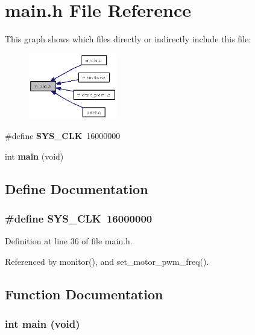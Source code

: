 \section{main.h File Reference}
\label{main_8h}


This graph shows which files directly or indirectly include this file:\begin{figure}[H]
\begin{center}
\leavevmode
\includegraphics[width=109pt]{main_8h__dep__incl}
\end{center}
\end{figure}
\begin{CompactItemize}
\item 
\#define {\bf SYS\_\-CLK}~16000000
\item 
int {\bf main} (void)
\end{CompactItemize}


\subsection{Define Documentation}
\subsubsection{\setlength{\rightskip}{0pt plus 5cm}\#define SYS\_\-CLK~16000000}\label{main_8h_b3a7892b9f9fbb5c3fc2cbdbceb10017}




Definition at line 36 of file main.h.

Referenced by monitor(), and set\_\-motor\_\-pwm\_\-freq().

\subsection{Function Documentation}
\subsubsection{\setlength{\rightskip}{0pt plus 5cm}int main (void)}\label{main_8h_840291bc02cba5474a4cb46a9b9566fe}




